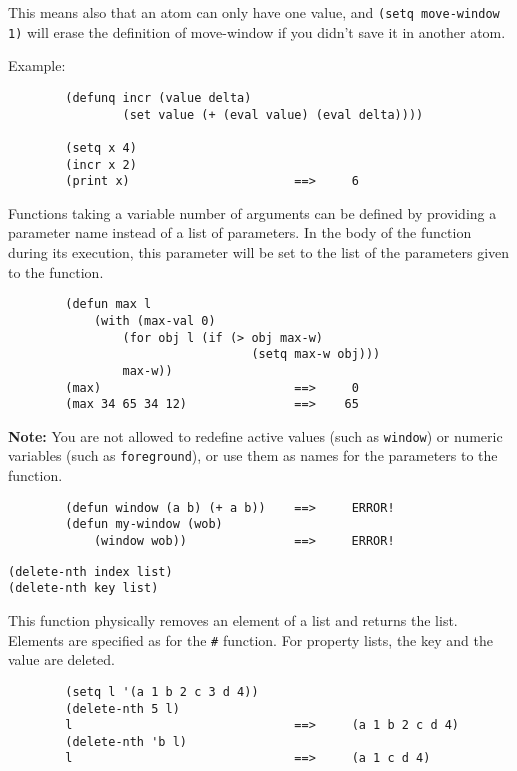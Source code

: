 This means also that an atom can only have one value, and {\tt (setq
move-window 1)} will erase the definition of move-window if you didn't save
it in another atom.

Example:{\exemplefont\upspace\begin{verbatim}
        (defunq incr (value delta)
                (set value (+ (eval value) (eval delta))))

        (setq x 4)
        (incr x 2)
        (print x)                       ==>     6
\end{verbatim}}

Functions taking a variable number of arguments can be defined by
providing a parameter name instead of a list of parameters. In the
body of the function during its execution, this parameter will be set
to the list of the parameters given to the function.

{\exemplefont\begin{verbatim}
        (defun max l
            (with (max-val 0) 
                (for obj l (if (> obj max-w)
                                  (setq max-w obj)))
                max-w))
        (max)                           ==>     0
        (max 34 65 34 12)               ==>    65
\end{verbatim}}

{\bf Note:} You are not allowed to redefine active values (such as
\verb"window") or numeric variables (such as \verb"foreground"), or use
them as names for the parameters to the function.

{\exemplefont\begin{verbatim}
        (defun window (a b) (+ a b))    ==>     ERROR!
        (defun my-window (wob) 
            (window wob))               ==>     ERROR!
\end{verbatim}}


{\usagefont\begin{verbatim}
(delete-nth index list)
(delete-nth key list)
\end{verbatim}}\usageupspace

This function physically removes an element of a list and returns the list. 
Elements are specified as for the \verb"#" function. 
For property lists, the key and the value are deleted.

{\exemplefont\begin{verbatim}
        (setq l '(a 1 b 2 c 3 d 4))
        (delete-nth 5 l)
        l                               ==>     (a 1 b 2 c d 4)
        (delete-nth 'b l)
        l                               ==>     (a 1 c d 4)
\end{verbatim}}

